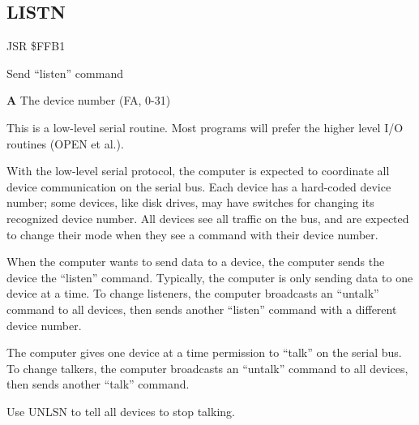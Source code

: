 \subsection{LISTN}
\label{KERNAL Jump Table!LISTN}
\begin{description}[leftmargin=2cm,style=nextline]
    \item [Address:] JSR \$FFB1
    \item [Description:] Send ``listen'' command
    \item [Inputs:]
        \textbf{A} The device number (FA, 0-31)
    \item [Remarks:]
        This is a low-level serial routine. Most programs will prefer the higher level I/O routines (OPEN et al.).

        With the low-level serial protocol, the computer is expected to coordinate all device communication on the serial bus. Each device has a hard-coded device number; some devices, like disk drives, may have switches for changing its recognized device number. All devices see all traffic on the bus, and are expected to change their mode when they see a command with their device number.

        When the computer wants to send data to a device, the computer sends the device the ``listen'' command. Typically, the computer is only sending data to one device at a time. To change listeners, the computer broadcasts an ``untalk'' command to all devices, then sends another ``listen'' command with a different device number.

        The computer gives one device at a time permission to ``talk'' on the serial bus. To change talkers, the computer broadcasts an ``untalk'' command to all devices, then sends another ``talk'' command.

        Use UNLSN to tell all devices to stop talking.
    \item [Example:]
\end{description}



\newpage
